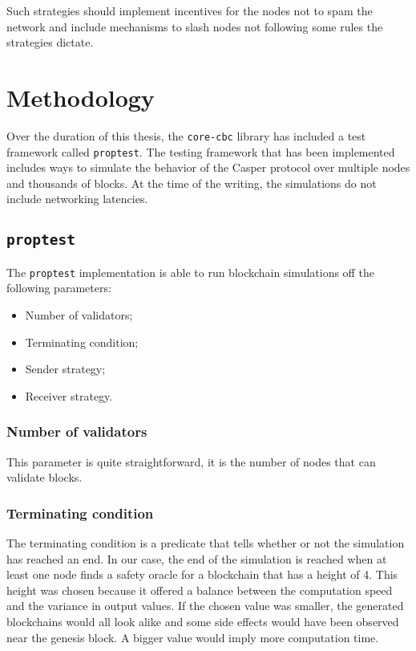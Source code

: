 Such strategies should implement incentives for the nodes not to spam the
network and include mechanisms to slash nodes not following some rules the
strategies dictate.

\section{Methodology}
Over the duration of this thesis, the \texttt{core-cbc} library has included a
test framework called \texttt{proptest}. The testing framework that has been
implemented includes ways to simulate the behavior of the Casper protocol over
multiple nodes and thousands  of blocks. At the time of the
writing, the simulations do not include networking latencies.

\subsection{\texttt{proptest}}
The \texttt{proptest} implementation is able to run blockchain simulations off
the following parameters:
\begin{itemize}
    \item Number of validators;
    \item Terminating condition;
    \item Sender strategy;
    \item Receiver strategy.
\end{itemize}

\subsubsection{Number of validators}
This parameter is quite straightforward, it is the number of nodes that can
validate blocks.

\subsubsection{Terminating condition}
The terminating condition is a predicate that tells whether or not the simulation has
reached an end. In our case, the end of the simulation is reached when at least
one node finds a safety oracle for a blockchain that has a height of 4. This
height was chosen because it offered a balance between the computation speed and
the variance in output values. If the chosen value was smaller, the generated
blockchains would all look alike and some side effects would have been observed
near the genesis block. A bigger value would imply more computation time.

